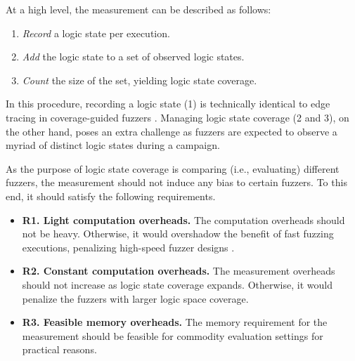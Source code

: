 \documentclass[letterpaper,twocolumn,10pt]{article}
\begin{document}

%
At a high level, the measurement can be described as follows:

\begin{enumerate}[noitemsep,label=\arabic*)]
  \item \emph{Record} a logic state per execution.
  \item \emph{Add} the logic state to a set of observed logic states.
  \item \emph{Count} the size of the set, yielding logic state coverage.
\end{enumerate}

In this procedure, recording a logic state (1) is technically identical to edge
tracing in coverage-guided fuzzers \cite{afl,fioraldi2020aflpp,libfuzzer}.
Managing logic state coverage (2 and 3), on the other hand, poses an extra
challenge as fuzzers are expected to observe a myriad of distinct logic states
during a campaign.


%
As the purpose of logic state coverage is comparing (i.e., evaluating) different
fuzzers, the measurement should not induce any bias to certain fuzzers. To this
end, it should satisfy the following requirements.

\begin{itemize}

  \item \textbf{R1. Light computation overheads.}
    The computation overheads should not be heavy. Otherwise, it would overshadow
    the benefit of fast fuzzing executions, penalizing high-speed fuzzer designs
    \cite{sergej2021nyx,schumilo2020hypercube,song2020agamotto}.

  \item \textbf{R2. Constant computation overheads.}
    The measurement overheads should not increase as logic state coverage
    expands. Otherwise, it would penalize the fuzzers with larger logic space
    coverage.

  \item \textbf{R3. Feasible memory overheads.}
    The memory requirement for the measurement should be feasible for commodity
    evaluation settings for practical reasons.
\end{itemize}
\end{document}
